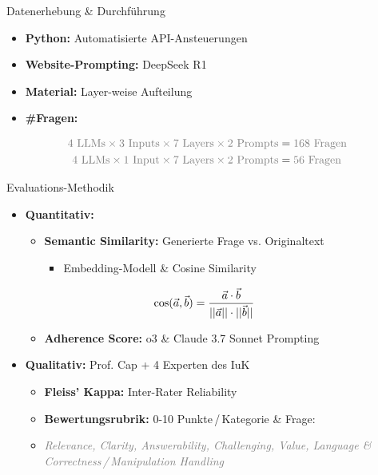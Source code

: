 \documentclass[usenames, dvipsnames, aspectratio=32]{beamer}
\begin{document}
\begin{frame}{Datenerhebung \& Durchführung}
    \begin{itemize}
        \item \textbf{Python:} Automatisierte API-Ansteuerungen
        \item \textbf{Website-Prompting:} DeepSeek R1
        \item \textbf{Material:} Layer-weise Aufteilung
        \item \textbf{\#Fragen:} 
    \end{itemize}
    \vspace{-.25em}
    \begin{align*}
        \textcolor{gray}{4 \text{ LLMs}\times 3 \text{ Inputs}\times 7 \text{ Layers}\times 2 \text{ Prompts}} &= \textcolor{gray}{168 \text{ Fragen}} \\
        \textcolor{gray}{4 \text{ LLMs}\times 1 \text{ Input}\times 7 \text{ Layers}\times 2 \text{ Prompts}} &= \textcolor{gray}{56 \text{ Fragen}}
    \end{align*}
\end{frame}

\begin{frame}[allowframebreaks]{Evaluations-Methodik}
    \begin{itemize}
        \item \textbf{Quantitativ:}
        \begin{itemize}
            \item \textbf{Semantic Similarity:} Generierte Frage vs. Originaltext
            \begin{itemize}
                \item[$\to$] Embedding-Modell \& Cosine Similarity \vspace{-.6em}
            \end{itemize}
            \begin{align*}
                \hspace{-3em}\cos(\vec{a}, \vec{b}) &= \frac{\vec{a} \cdot \vec{b}}{||\vec{a}|| \cdot ||\vec{b}||} 
            \end{align*}
            \item \textbf{Adherence Score:} o3 \& Claude 3.7 Sonnet Prompting
        \end{itemize}
        \item \textbf{Qualitativ:} Prof. Cap + 4 Experten des IuK 
        \begin{itemize}
            \item \textbf{Fleiss' Kappa:} Inter-Rater Reliability
            \item \textbf{Bewertungsrubrik:} 0-10 Punkte\,/\,Kategorie \& Frage:
            \item[] \textit{\textcolor{gray}{Relevance, Clarity, Answerability, Challenging, Value, Language \& Correctness\,/\,Manipulation Handling}}
        \end{itemize}
    \end{itemize}
\end{frame}
\end{document}
